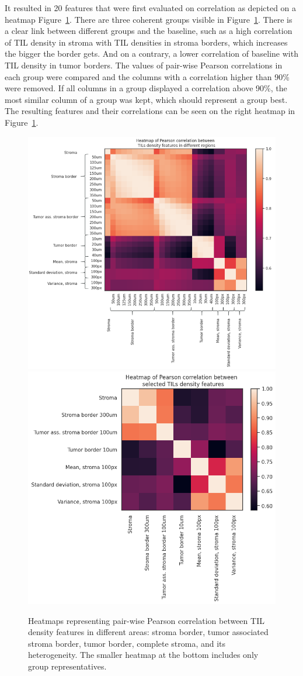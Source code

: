 It resulted in 20 features
that were first evaluated on correlation as depicted on a heatmap Figure~\ref{fig:heatmaps_tils}.
There are three coherent groups visible in Figure~\ref{fig:heatmaps_tils}.
There is a clear link between different groups and the baseline, such as a high correlation
of TIL density in stroma with TIL densities in stroma borders, which increases the bigger
the border gets. And on a contrary, a lower correlation of baseline with TIL density in tumor borders.
The values of pair-wise Pearson correlations in each group were compared and the columns with
a correlation higher than 90\% were removed. If all columns in a group displayed a
correlation above 90\%, the most similar column of a group was kept, which should
represent a group best. The resulting features and their correlations can be seen on the right heatmap
in Figure~\ref{fig:heatmaps_tils}.
\begin{figure}[h!]
\centering
\includegraphics[width=0.7\linewidth]{figures/survival/heatmap_tils.png}
\includegraphics[width=.6\linewidth]{figures/survival/heatmap_tils_min.png}
\caption{Heatmaps representing pair-wise Pearson correlation between TIL density features in different areas: stroma border, tumor associated stroma border, tumor border, complete stroma, and its heterogeneity.
The smaller heatmap at the bottom includes only group representatives.}
\label{fig:heatmaps_tils}
\end{figure}
